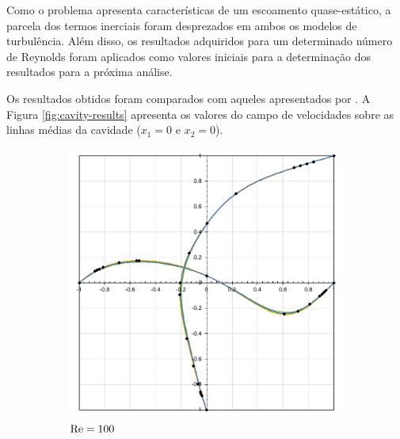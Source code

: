 Como o problema apresenta características de um escoamento quase-estático, a parcela dos termos inerciais foram desprezados em ambos os modelos de turbulência. Além disso, os resultados adquiridos para um determinado número de Reynolds foram aplicados como valores iniciais para a determinação dos resultados para a próxima análise.

Os resultados obtidos foram comparados com aqueles apresentados por . A Figura \ref{fig:cavity-results} apresenta os valores do campo de velocidades sobre as linhas médias da cavidade ($x_1=0$ e $x_2=0$).

\begin{figure}[h]
    \centering
    \caption{Valores do campo de velocidades sobre as linhas médias da cavidade.}
    \begin{subfigure}{0.4\textwidth}
    \includegraphics[width=\linewidth]{Figuras/Cavity/Re100.pdf}
    \caption{$\mathrm{Re}=100$}
    \end{subfigure}
    \begin{subfigure}{0.4\textwidth}

\end{subfigure}
\end{figure}
